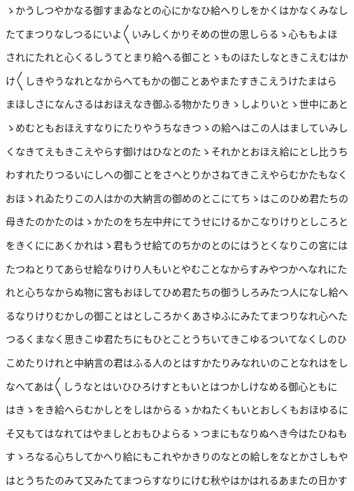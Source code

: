 \documentclass[a4paper,11pt,landscape]{ltjtarticle}
\begin{document}
\par\medskip
ゝかうしつやかなる御すまゐなとの心にかなひ給へりしをかくはかなくみなし
\par\medskip
たてまつりなしつるにいよ〱いみしくかりそめの世の思しらるゝ心ももよほ
\par\medskip
されにたれと心くるしうてとまり給へる御ことゝものほたしなときこえむはか
\par\medskip
け〱しきやうなれとなからへてもかの御ことあやまたすきこえうけたまはら
\par\medskip
まほしさになんさるはおほえなき御ふる物かたりきゝしよりいとゝ世中にあと
\par\medskip
ゝめむともおほえすなりにたりやうちなきつゝの給へはこの人はましていみし
\par\medskip
くなきてえもきこえやらす御けはひなとのたゝそれかとおほえ給にとし比うち
\par\medskip
わすれたりつるいにしへの御ことをさへとりかさねてきこえやらむかたもなく
\par\medskip
おほゝれゐたりこの人はかの大納言の御めのとこにてちゝはこのひめ君たちの
\par\medskip
母きたのかたのはゝかたのをち左中弁にてうせにけるかこなりけりとしころと
\par\medskip
をきくににあくかれはゝ君もうせ給てのちかのとのにはうとくなりこの宮には
\par\medskip
たつねとりてあらせ給なりけり人もいとやむことなからすみやつかへなれにた
\par\medskip
れと心ちなからぬ物に宮もおほしてひめ君たちの御うしろみたつ人になし給へ
\par\medskip
るなりけりむかしの御ことはとしころかくあさゆふにみたてまつりなれ心へた
\par\medskip
つるくまなく思きこゆ君たちにもひとことうちいてきこゆるついてなくしのひ
\par\medskip
こめたりけれと中納言の君はふる人のとはすかたりみなれいのことなれはをし
\par\medskip
なへてあは〱しうなとはいひひろけすともいとはつかしけなめる御心ともに
\par\medskip
はきゝをき給へらむかしとをしはからるゝかねたくもいとおしくもおほゆるに
\par\medskip
そ又もてはなれてはやましとおもひよらるゝつまにもなりぬへき今はたひねも
\par\medskip
すゝろなる心ちしてかへり給にもこれやかきりのなとの給しをなとかさしもや
\par\medskip
はとうちたのみて又みたてまつらすなりにけむ秋やはかはれるあまたの日かす
\par\medskip
\end{document}
